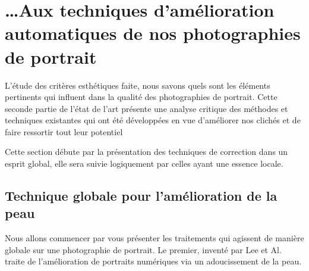 \documentclass[11pt, french]{report-rd-info}
\begin{document}
\section{\ldots Aux techniques d’amélioration automatiques de nos photographies de portrait}
L’étude des critères esthétiques faite, nous savons quels sont les éléments pertinents qui influent dans la qualité des photographies de portrait. Cette seconde partie de l’état de l’art présente une analyse critique des méthodes et techniques existantes qui ont été développées en vue d’améliorer nos clichés et de faire ressortir tout leur potentiel 

Cette section débute par la présentation des techniques de correction dans un esprit global, elle sera suivie logiquement par celles ayant une essence locale.

\subsection{Technique globale pour l’amélioration de la peau}
Nous allons commencer par vous présenter les traitements qui agissent de manière globale sur une photographie de portrait. Le premier, inventé par Lee et Al.\cite{Lee} traite de l'amélioration de portraits numériques via un adoucissement de la peau.
\end{document}
